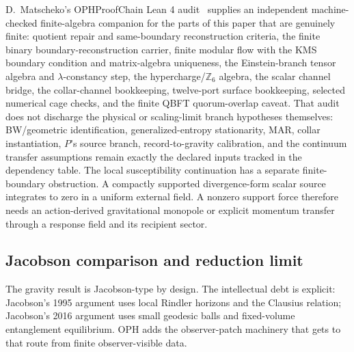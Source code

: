\documentclass[11pt]{article}
\begin{document}
D.\ Matscheko's OPHProofChain Lean 4 audit~\cite{matschekoProofChain} supplies an independent
machine-checked finite-algebra companion for the parts of this paper that are
genuinely finite: quotient repair and same-boundary reconstruction criteria,
the finite binary boundary-reconstruction carrier, finite modular flow with the
KMS boundary condition and matrix-algebra uniqueness, the Einstein-branch tensor
algebra and \(\lambda\)-constancy step, the hypercharge/\(\mathbb Z_6\) algebra,
the scalar channel bridge, the collar-channel bookkeeping, twelve-port surface
bookkeeping, selected numerical cage checks, and the finite QBFT quorum-overlap
caveat.  That audit does not discharge the physical or scaling-limit branch
hypotheses themselves: BW/geometric identification, generalized-entropy
stationarity, MAR, collar instantiation, \(P\)'s source branch,
record-to-gravity calibration, and the continuum transfer assumptions remain
exactly the declared inputs tracked in the dependency table.
The local susceptibility continuation has a separate finite-boundary
obstruction.  A compactly supported divergence-form scalar source integrates
to zero in a uniform external field.  A nonzero support force therefore needs
an action-derived gravitational monopole or explicit momentum transfer through
a response field and its recipient sector.

\subsection*{Jacobson comparison and reduction limit}

The gravity result is Jacobson-type by design. The intellectual debt is explicit: Jacobson's 1995
argument uses local Rindler horizons and the Clausius relation; Jacobson's 2016 argument uses
small geodesic balls and fixed-volume entanglement equilibrium. OPH adds the observer-patch
machinery that gets to that route from finite observer-visible data.
\end{document}
